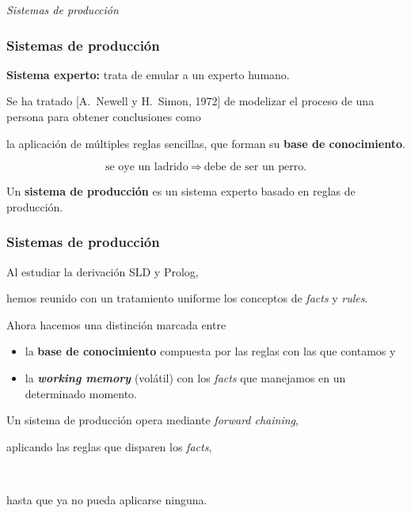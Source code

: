 \documentclass{beamer}    %
\begin{document}
\begin{frame}
\centerline{\emph{Sistemas de producción}}
\end{frame}

\begin{frame}
 \frametitle{Sistemas de producción}

 {\bf Sistema experto:} trata de emular a un experto humano.
 \vspace{4mm}

 Se ha tratado [{\sc A. Newell} y {\sc H. Simon}, 1972] de
 modelizar el proceso de una persona para obtener
 conclusiones como\\[2mm] \hfill\parbox{.85\linewidth}{la
   aplicación de múltiples reglas sencillas, que forman su
   {\bf base de conocimiento}.}
 \[\mbox{se oye un ladrido}
   \ \Rightarrow\ 
   \mbox{debe de ser un perro.}\]

 \pause

 Un {\bf sistema de producción} es un sistema experto
 basado en reglas de producción.
\end{frame}

\begin{frame}[t]
 \frametitle{Sistemas de producción}

 Al estudiar la derivación SLD y Prolog,\\[2mm]
 \hfill\parbox{.85\linewidth}{hemos reunido con un
   tratamiento uniforme los conceptos de \emph{facts} y
   \emph{rules}.}
 \vspace{4mm}

 Ahora hacemos una distinción marcada entre
 \begin{itemize}
 \item
 la {\bf base de conocimiento} compuesta por las reglas con
 las que contamos y
 \item
 la {\bf \emph{working memory}} (volátil) con los
 \emph{facts} que manejamos en un determinado momento.
 \end{itemize}
 \vspace{4mm}

 \pause

 Un sistema de producción opera mediante \emph{forward
   chaining},\\[2mm]
 \hfill\parbox{.85\linewidth}{aplicando las reglas que
   disparen los \emph{facts},}\\[2mm]
 \hfill\parbox{.7\linewidth}{hasta que ya no pueda aplicarse
   ninguna.}\\[2mm]
\end{frame}
\end{document}
